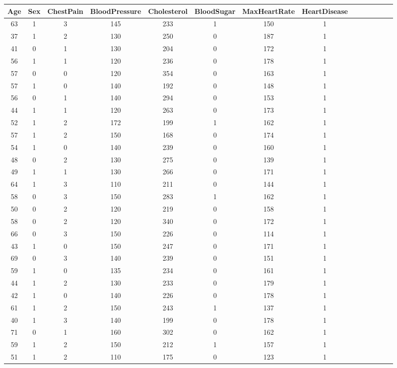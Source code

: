 \documentclass{article}
\begin{document}
\begin{longtable}{|c|c|c|c|c|c|c|c|c|c|c|c|c|c|}
\hline
Age & Sex & ChestPain & BloodPressure & Cholesterol & BloodSugar & MaxHeartRate & HeartDisease\\
\hline
\endfirsthead
\hline
63 & 1 & 3 & 145 & 233 & 1 & 150 & 1\\
\hline
37 & 1 & 2 & 130 & 250 & 0 & 187 & 1\\
\hline
41 & 0 & 1 & 130 & 204 & 0 & 172 & 1\\
\hline
56 & 1 & 1 & 120 & 236 & 0 & 178 & 1\\
\hline
57 & 0 & 0 & 120 & 354 & 0 & 163 & 1\\
\hline
57 & 1 & 0 & 140 & 192 & 0 & 148 & 1\\
\hline
56 & 0 & 1 & 140 & 294 & 0 & 153 & 1\\
\hline
44 & 1 & 1 & 120 & 263 & 0 & 173 & 1\\
\hline
52 & 1 & 2 & 172 & 199 & 1 & 162 & 1\\
\hline
57 & 1 & 2 & 150 & 168 & 0 & 174 & 1\\
\hline
54 & 1 & 0 & 140 & 239 & 0 & 160 & 1\\
\hline
48 & 0 & 2 & 130 & 275 & 0 & 139 & 1\\
\hline
49 & 1 & 1 & 130 & 266 & 0 & 171 & 1\\
\hline
64 & 1 & 3 & 110 & 211 & 0 & 144 & 1\\
\hline
58 & 0 & 3 & 150 & 283 & 1 & 162 & 1\\
\hline
50 & 0 & 2 & 120 & 219 & 0 & 158 & 1\\
\hline
58 & 0 & 2 & 120 & 340 & 0 & 172 & 1\\
\hline
66 & 0 & 3 & 150 & 226 & 0 & 114 & 1\\
\hline
43 & 1 & 0 & 150 & 247 & 0 & 171 & 1\\
\hline
69 & 0 & 3 & 140 & 239 & 0 & 151 & 1\\
\hline
59 & 1 & 0 & 135 & 234 & 0 & 161 & 1\\
\hline
44 & 1 & 2 & 130 & 233 & 0 & 179 & 1\\
\hline
42 & 1 & 0 & 140 & 226 & 0 & 178 & 1\\
\hline
61 & 1 & 2 & 150 & 243 & 1 & 137 & 1\\
\hline
40 & 1 & 3 & 140 & 199 & 0 & 178 & 1\\
\hline
71 & 0 & 1 & 160 & 302 & 0 & 162 & 1\\
\hline
59 & 1 & 2 & 150 & 212 & 1 & 157 & 1\\
\hline
51 & 1 & 2 & 110 & 175 & 0 & 123 & 1\\

\end{longtable}
\end{document}
